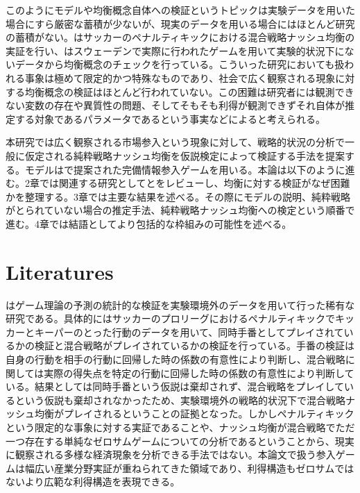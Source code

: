 \documentclass{jsarticle}
\begin{document}
このようにモデルや均衡概念自体への検証というトピックは実験データを用いた場合にすら厳密な蓄積が少ないが、現実のデータを用いる場合にはほとんど研究の蓄積がない。\cite{Chiappori2002}はサッカーのペナルティキックにおける混合戦略ナッシュ均衡の実証を行い、\cite{Ostling2011}はスウェーデンで実際に行われたゲームを用いて実験的状況下にないデータから均衡概念のチェックを行っている。こういった研究においても扱われる事象は極めて限定的かつ特殊なものであり、社会で広く観察される現象に対する均衡概念の検証はほとんど行われていない。この困難は研究者には観測できない変数の存在や異質性の問題、そしてそもそも利得が観測できずそれ自体が推定する対象であるパラメータであるという事実などによると考えられる。

本研究では広く観察される市場参入という現象に対して、戦略的状況の分析で一般に仮定される純粋戦略ナッシュ均衡を仮説検定によって検証する手法を提案する。モデルは\cite{Bresnahan1991}で提案された完備情報参入ゲームを用いる。本論は以下のように進む。2章では関連する研究として\cite{Ostling2011}と\cite{Chiappori2002}をレビューし、均衡に対する検証がなぜ困難かを整理する。3章では主要な結果を述べる。その際にモデルの説明、純粋戦略がとられていない場合の推定手法、純粋戦略ナッシュ均衡への検定という順番で進む。4章では結語としてより包括的な枠組みの可能性を述べる。


\section{Literatures}

\cite{Chiappori2002}はゲーム理論の予測の統計的な検証を実験環境外のデータを用いて行った稀有な研究である。具体的にはサッカーのプロリーグにおけるペナルティキックでキッカーとキーパーのとった行動のデータを用いて、同時手番としてプレイされているかの検証と混合戦略がプレイされているかの検証を行っている。手番の検証は自身の行動を相手の行動に回帰した時の係数の有意性により判断し、混合戦略に関しては実際の得失点を特定の行動に回帰した時の係数の有意性により判断している。結果としては同時手番という仮説は棄却されず、混合戦略をプレイしているという仮説も棄却されなかったため、実験環境外の戦略的状況下で混合戦略ナッシュ均衡がプレイされるということの証拠となった。しかしペナルティキックという限定的な事象に対する実証であることや、ナッシュ均衡が混合戦略でただ一つ存在する単純なゼロサムゲームについての分析であるということから、現実に観察される多様な経済現象を分析できる手法ではない。本論文で扱う参入ゲームは幅広い産業分野実証が重ねられてきた領域であり、利得構造もゼロサムではないより広範な利得構造を表現できる。
\end{document}
